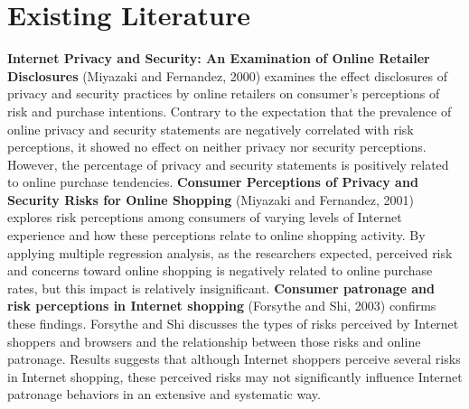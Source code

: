 \documentclass[11pt,twoside]{article}
\begin{document}
\section{Existing Literature}
\textbf{Internet Privacy and Security: An Examination of Online Retailer Disclosures} (Miyazaki and Fernandez, 2000) examines the effect disclosures of privacy and security practices by online retailers on consumer’s perceptions of risk and purchase intentions. Contrary to the expectation that the prevalence of online privacy and security statements are negatively correlated with risk perceptions, it showed no effect on neither privacy nor security perceptions. However, the percentage of privacy and security statements is positively related to online purchase tendencies. \textbf{Consumer Perceptions of Privacy and Security Risks for Online Shopping} (Miyazaki and Fernandez, 2001) explores risk perceptions among consumers of varying levels of Internet experience and how these perceptions relate to online shopping activity. By applying multiple regression analysis, as the researchers expected, perceived risk and concerns toward online shopping is negatively related to online purchase rates, but this impact is relatively insignificant. \textbf{Consumer patronage and risk perceptions in Internet shopping} (Forsythe and Shi, 2003) confirms these findings. Forsythe and Shi discusses the types of risks perceived by Internet shoppers and browsers and the relationship between those risks and online patronage. Results suggests that although Internet shoppers perceive several risks in Internet shopping, these perceived risks may not significantly influence Internet patronage behaviors in an extensive and systematic way. \\
\end{document}
